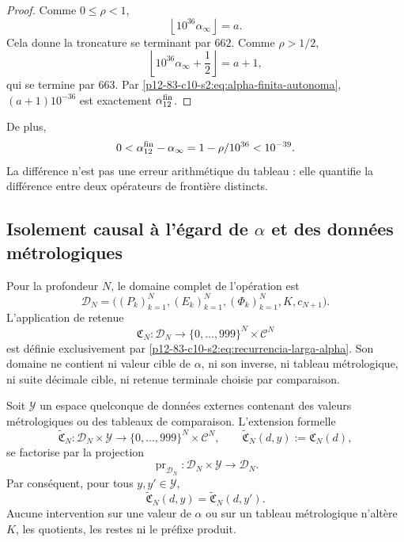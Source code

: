 \begin{proof}
Comme \(0\leq\rho<1\),
\[
 \left\lfloor10^{36}\alpha_\infty\right\rfloor=a.
\]
Cela donne la troncature se terminant par \(662\). Comme \(\rho>1/2\),
\[
 \left\lfloor10^{36}\alpha_\infty+\frac12\right\rfloor=a+1,
\]
qui se termine par \(663\). Par \eqref{p12-83-c10-s2:eq:alpha-finita-autonoma},
\((a+1)10^{-36}\) est exactement \(\alpha_{12}^{\rm fin}\).
\end{proof}

De plus,
\[
 0<\alpha_{12}^{\rm fin}-\alpha_\infty
 =\frac{1-\rho}{10^{36}}<10^{-39}.
\]
La différence n’est pas une erreur arithmétique du tableau : elle quantifie la
différence entre deux opérateurs de frontière distincts.

\subsection{Isolement causal à l’égard de \texorpdfstring{\(\alpha\)}{alpha} et des données métrologiques}

Pour la profondeur \(N\), le domaine complet de l’opération est
\[
 \mathscr D_N
 =\bigl((P_k)_{k=1}^{N},(E_k)_{k=1}^{N},
        (\Phi_k)_{k=1}^{N},K,c_{N+1}\bigr).
\]
L’application de retenue
\[
 \mathfrak C_N:\mathscr D_N
 \longrightarrow
 \{0,\ldots,999\}^{N}\times\mathcal C^{N}
\]
est définie exclusivement par \eqref{p12-83-c10-s2:eq:recurrencia-larga-alpha}. Son
domaine ne contient ni valeur cible de \(\alpha\), ni son inverse, ni tableau
métrologique, ni suite décimale cible, ni retenue terminale choisie par
comparaison.

\begin{theorem}
\label{p12-83-c10-s2:thm:no-interferencia-metrologica-alpha}
Soit \(\mathscr Y\) un espace quelconque de données externes contenant des valeurs
métrologiques ou des tableaux de comparaison. L’extension formelle
\[
 \widetilde{\mathfrak C}_N:
 \mathscr D_N\times\mathscr Y
 \longrightarrow
 \{0,\ldots,999\}^{N}\times\mathcal C^{N},
 \qquad
 \widetilde{\mathfrak C}_N(d,y):=\mathfrak C_N(d),
\]
se factorise par la projection
\[
 \operatorname{pr}_{\mathscr D_N}:
 \mathscr D_N\times\mathscr Y\longrightarrow\mathscr D_N.
\]
Par conséquent, pour tous \(y,y'\in\mathscr Y\),
\[
 \widetilde{\mathfrak C}_N(d,y)
 =\widetilde{\mathfrak C}_N(d,y').
\]
Aucune intervention sur une valeur de \(\alpha\) ou sur un tableau
métrologique n’altère \(K\), les quotients, les restes ni le préfixe produit.
\end{theorem}


